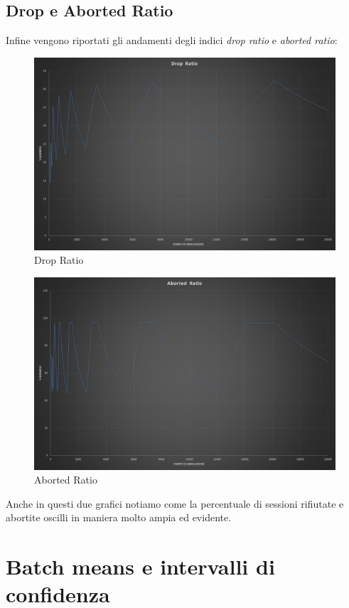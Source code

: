 \subsection{Drop e Aborted Ratio}
Infine vengono riportati gli andamenti degli indici \textit{drop ratio} e \textit{aborted ratio}:
\begin{figure}[H]
 \centering
 \includegraphics[scale=0.4]{img/dropRatio.png}
 \caption[Drop Ratio]{Drop Ratio}
 \label{fig:Drop Ratio}
\end{figure}
\begin{figure}[H]
 \centering
 \includegraphics[scale=0.4]{img/abortRatio.png}
 \caption[Aborted Ratio]{Aborted Ratio}
 \label{fig:Aborted Ratio}
\end{figure}
Anche in questi due grafici notiamo come la percentuale di sessioni rifiutate e abortite
oscilli in maniera molto ampia ed evidente.
\section{Batch means e intervalli di confidenza}

